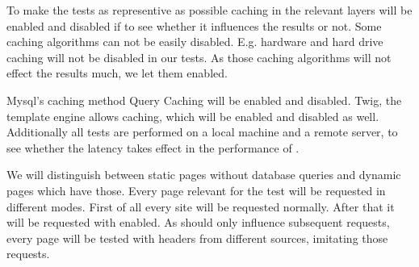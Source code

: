 To make the tests as representive as possible caching in the relevant layers will be enabled and disabled if to see whether it influences the results or not.
Some caching algorithms can not be easily disabled.
E.g. hardware and hard drive caching will not be disabled in our tests.
As those caching algorithms will not effect the results much, we let them enabled.

Mysql's caching method Query Caching will be enabled and disabled.
Twig, the template engine allows caching, which will be enabled and disabled as well.
Additionally all tests are performed on a local machine and a remote server, to see whether the latency takes effect in the performance of \lare{}.

We will distinguish between static pages without database queries and dynamic pages which have those.
Every page relevant for the test will be requested in different modes.
First of all every site will be requested normally.
After that it will be requested with \lare{} enabled.
As \lare{} should only influence subsequent requests, every page will be tested with \http{} headers from different sources, imitating those requests.

%
%
%


